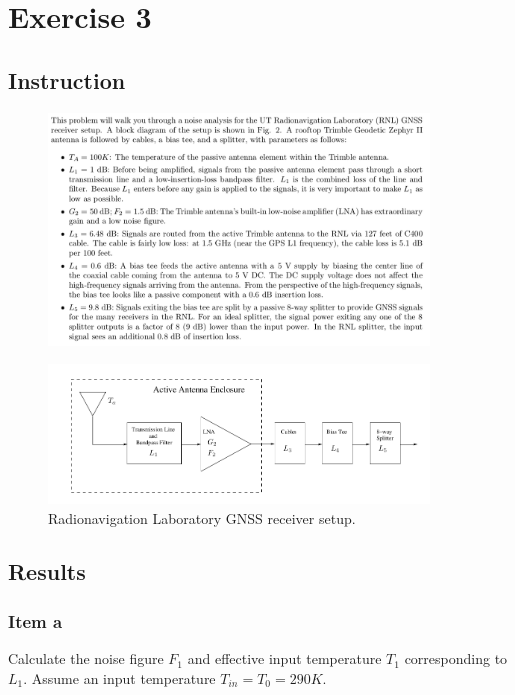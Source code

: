 \section{Exercise 3}

\subsection{Instruction}

\begin{figure}[H]
	\centering
	\includegraphics[width=0.9\textwidth]{figs/ex3_instructions.png}
\end{figure}

\begin{figure}[H]
	\centering
	\includegraphics[width=0.9\textwidth]{figs/ex3_diagram.png}
	\caption{Radionavigation Laboratory GNSS receiver setup.}
	\label{fig:ex3_diagram}
\end{figure}

\subsection{Results}

\subsubsection{Item a}

Calculate the noise figure $F_1$ and effective input temperature $T_1$
corresponding to $L_1$. Assume an input temperature $T_{in} = T_0 = 290K$.

